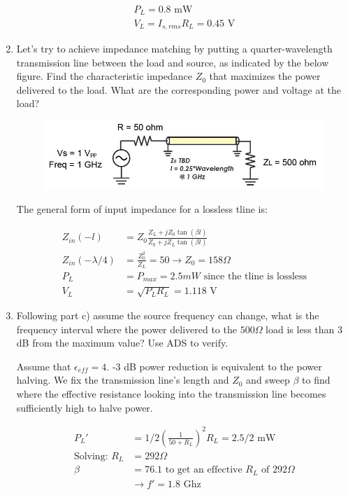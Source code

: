 \documentclass[11pt]{article}
\begin{document}
\begin{enumerate}
	\begin{align*}
		P_L = 0.8 \text{ mW} \\
		V_L = I_{s,rms} R_L = 0.45 \text{ V}
	\end{align*}
	
	\item Let's try to achieve impedance matching by putting a quarter-wavelength transmission line between the load and source, as indicated by the below figure. Find the characteristic impedance $Z_0$ that maximizes the power delivered to the load. What are the corresponding power and voltage at the load?
	
	\begin{figure}[H]
		\centering \includegraphics[width=\textwidth-6cm]{images/problem3c.jpg}
	\end{figure}

	The general form of input impedance for a lossless tline is:
	
	\begin{align*}
		Z_{in}(-l) &= Z_0 \frac{Z_L + j Z_0 \tan(\beta l)}{Z_0 + j Z_L \tan(\beta l)} \\
		Z_{in}(-\lambda/4) &= \frac{Z_0^2}{Z_L} = 50 \rightarrow Z_0 = 158 \Omega \\
		P_{L} &= P_{max} = 2.5 mW \text{ since the tline is lossless} \\
		V_{L} &= \sqrt{P_L R_L} = 1.118 \text{ V}
	\end{align*}
	
	\item Following part c) assume the source frequency can change, what is the frequency interval where the power delivered to the $500\Omega$ load is less than 3 dB from the maximum value? Use ADS to verify.
	
	Assume that $\epsilon_{eff} = 4$. -3 dB power reduction is equivalent to the power halving. We fix the transmission line's length and $Z_0$ and sweep $\beta$ to find where the effective resistance looking into the transmission line becomes sufficiently high to halve power.
	
	\begin{align*}
		P_L' &= 1/2 (\frac{1}{50 + R_L})^2 R_L = 2.5 /2 \text{ mW} \\
		\text{Solving: } R_L &= 292 \Omega \\
		\beta &= 76.1 \text{ to get an effective } R_L \text{ of } 292 \Omega  \\
		&\rightarrow f' = 1.8 \text{ Ghz}
	\end{align*}
	

\end{enumerate}
\end{document}
